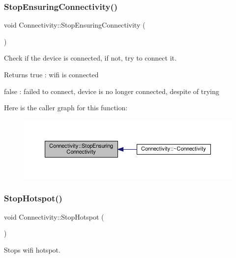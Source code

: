\subsubsection{\texorpdfstring{Stop\+Ensuring\+Connectivity()}{StopEnsuringConnectivity()}}
{\footnotesize\ttfamily void Connectivity\+::\+Stop\+Ensuring\+Connectivity (\begin{DoxyParamCaption}{ }\end{DoxyParamCaption})\hspace{0.3cm}{\ttfamily [private]}}



Check if the device is connected, if not, try to connect it. 

\begin{DoxyReturn}{Returns}
true \+: wifi is connected 

false \+: failed to connect, device is no longer connected, despite of trying 
\end{DoxyReturn}
Here is the caller graph for this function\+:
\nopagebreak
\begin{figure}[H]
\begin{center}
\leavevmode
\includegraphics[width=350pt]{classConnectivity_a8d01492828472cc2edf8af89682b40e9_icgraph}
\end{center}
\end{figure}
\mbox{\label{classConnectivity_aaa9ca6a4b59d47cd1135101af1056a22}} 
\subsubsection{\texorpdfstring{Stop\+Hotspot()}{StopHotspot()}}
{\footnotesize\ttfamily void Connectivity\+::\+Stop\+Hotspot (\begin{DoxyParamCaption}{ }\end{DoxyParamCaption})\hspace{0.3cm}{\ttfamily [private]}}



Stops wifi hotspot. 

